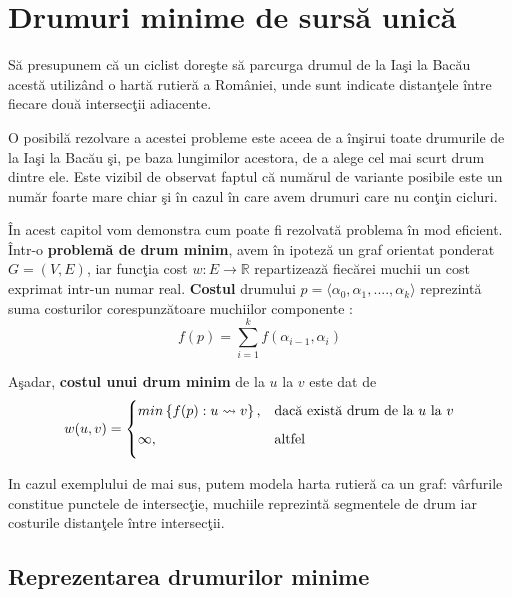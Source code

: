 \documentclass[11pt,a4paper]{report}
\newcommand{\R}{\mathbb{R}}
\begin{document}
   	
   
    \chapter{Drumuri minime de surs\u a unic\u a}

    
    S\u a presupunem c\u a un ciclist dore\c ste s\u a parcurga drumul de la Ia\c si la Bac\u au acest\u a utiliz\^and o hart\u a rutier\u a a Rom\^ aniei, unde sunt indicate distan\c tele \^ intre fiecare dou\u a intersec\c tii adiacente.
    
    O posibil\u a rezolvare a acestei probleme este aceea de a \^ in\c sirui toate drumurile de la Ia\c si la Bac\u au \c si, pe baza lungimilor acestora, de a alege cel mai scurt drum dintre ele. Este vizibil de observat faptul c\u a num\u arul de variante posibile este un num\u ar foarte mare chiar \c si \^ in cazul \^ in care avem drumuri care nu con\c tin cicluri.
    
    \^ In acest capitol vom demonstra cum poate fi rezolvat\u a problema \^ in mod eficient. \^ Intr-o \textbf{problem\u a de drum minim}, avem \^ in ipotez\u a un graf orientat ponderat $G=(V,E)$, iar func\c tia cost $w:E \longrightarrow \R $ repartizeaz\u a fiec\u arei muchii un cost exprimat intr-un numar real. \textbf{Costul} drumului  $p=\langle \alpha_{0},\alpha_{1},....,\alpha_{k}\rangle$ reprezint\u a suma costurilor corespunz\u atoare muchiilor componente :
    \begin{equation*}
    f(p)=\sum\limits_{i=1}^{k} f(\alpha_{i-1},\alpha_{i})
    \end{equation*}
    
    A\c sadar, \textbf{costul unui drum minim} de la $u$ la $v$ este dat de
  	\begin{equation*}
  		w(u,v)=
  		\begin{cases}
  	    min\left\{f(p):u\leadsto v\right\},&\text{dac\u a exist\u a drum de la $u$ la $v$} \medskip\\
  		\infty,& \text{altfel} \medskip
  		\end{cases}
  		\end{equation*}
  		
  	In cazul exemplului de mai sus, putem modela harta rutier\u a ca un graf: v\^arfurile constitue punctele de intersec\c tie, muchiile reprezint\u a segmentele de drum iar costurile distan\c tele \^ intre intersec\c tii.
  	
  	\section{Reprezentarea drumurilor minime}
  	
\end{document}
